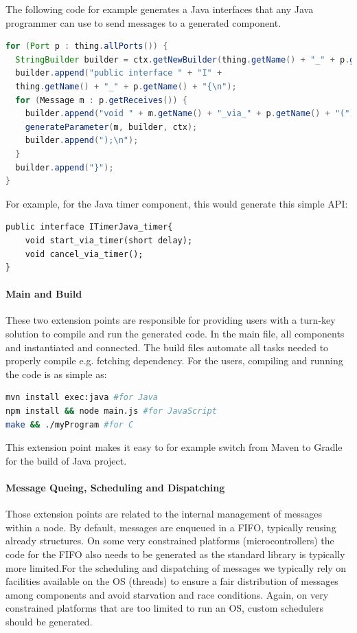 The following code for example generates a Java interfaces that any Java programmer can use to send messages to a generated component. 

\begin{lstlisting}[language=Java]
for (Port p : thing.allPorts()) { 
  StringBuilder builder = ctx.getNewBuilder(thing.getName() + "_" + p.getName() + ".java"); 
  builder.append("public interface " + "I" +  
  thing.getName() + "_" + p.getName() + "{\n"); 
  for (Message m : p.getReceives()) { 
    builder.append("void " + m.getName() + "_via_" + p.getName() + "("); 
    generateParameter(m, builder, ctx); 
    builder.append(");\n"); 
  } 
  builder.append("}"); 
}
\end{lstlisting}

For example, for the Java timer component, this would generate this simple API: 


\begin{lstlisting}
public interface ITimerJava_timer{ 
	void start_via_timer(short delay); 
	void cancel_via_timer(); 
}
\end{lstlisting}

\paragraph{Main and Build}

These two extension points are responsible for providing users with a turn-key solution to compile and run the generated code. In the main file, all components and instantiated and connected. The build files automate all tasks needed to properly compile e.g. fetching dependency. For the users, compiling and running the code is as simple as: 

\begin{lstlisting}[language=bash]
mvn install exec:java #for Java 
npm install && node main.js #for JavaScript
make && ./myProgram #for C 
\end{lstlisting}

This extension point makes it easy to for example switch from Maven to Gradle for the build of Java project. 

\paragraph{Message Queing, Scheduling and Dispatching}

Those extension points are related to the internal management of messages within a node. By default, messages are enqueued in a FIFO, typically reusing already structures. On some very constrained platforms (microcontrollers) the code for the FIFO also needs to be generated as the standard library is typically more limited.For the scheduling and dispatching of messages we typically rely on facilities available on the OS (threads) to ensure a fair distribution of messages among components and avoid starvation and race conditions. Again, on very constrained platforms that are too limited to run an OS, custom schedulers should be generated.

